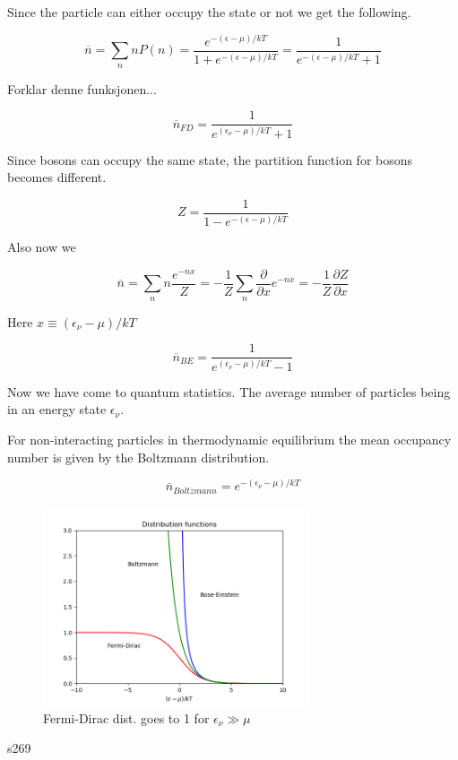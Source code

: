 Since the particle can either occupy the state or not we get the following.

\begin{equation}
\overline{n} = \sum_n n P(n) = \frac{e^{-(\epsilon - \mu)/kT}}{ 1 + e^{-(\epsilon - \mu)/kT}} = \frac{1}{e^{-(\epsilon - \mu)/kT} + 1}
\end{equation}

Forklar denne funksjonen...

\begin{equation}
\overline{n}_{FD} = \frac{1}{e^{(\epsilon_{\nu} - \mu)/kT} + 1}
\end{equation}

Since bosons can occupy the same state, the partition function  for bosons becomes different. 

\begin{equation}
Z = \frac{1}{1 - e^{-(\epsilon - \mu)/kT}}
\end{equation}

Also now we 

\begin{equation}
\overline{n} = \sum_n n \frac{e^{-nx}}{Z} = -\frac{1}{Z} \sum_n \frac{\partial}{\partial x} e^{-nx} = -\frac{1}{Z} \frac{\partial Z}{\partial x}
\end{equation}

Here $x \equiv (\epsilon_{\nu} - \mu)/kT$

\begin{equation}
\overline{n}_{BE} = \frac{1}{e^{(\epsilon_{\nu} - \mu)/kT} - 1}
\end{equation}

Now we have come to quantum statistics.
The average number of particles being in an energy state $\epsilon_{\nu}$.

For non-interacting particles in thermodynamic equilibrium the mean occupancy number is given by the Boltzmann distribution.

\begin{equation}
\overline{n}_{Boltzmann} = e^{-(\epsilon_{\nu} - \mu)/kT}
\end{equation}

\begin{figure}
    \centering
    \includegraphics[width=0.7\textwidth]{images/distributions.png}
    \caption{Fermi-Dirac dist. goes to 1 for $\epsilon_{\nu} \gg \mu$}
    \label{fig:dist_therm_stat}
\end{figure} 
s269

